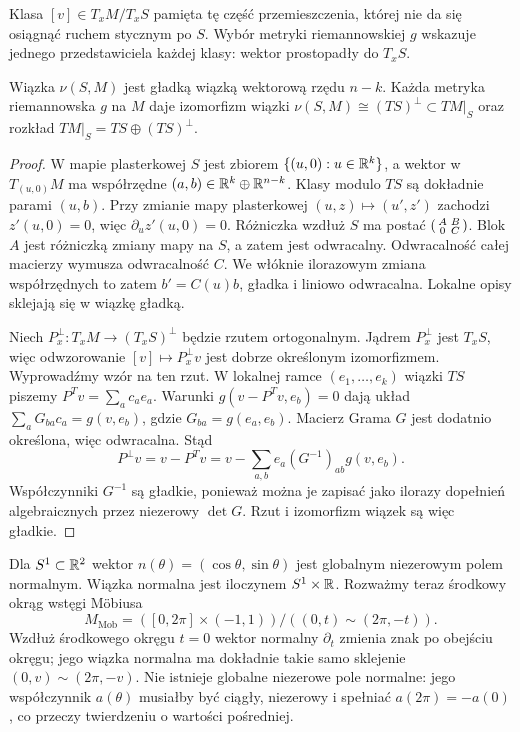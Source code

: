 Klasa $[v]\in T_xM/T_xS$ pamięta tę część
przemieszczenia, której nie da się osiągnąć
ruchem stycznym po $S$. Wybór metryki
riemannowskiej $g$ wskazuje jednego
przedstawiciela każdej klasy: wektor
prostopadły do $T_xS$.

\begin{stwierdzenie}
\label{prop:normalna-rozszczepienie}
Wiązka $\nu(S,M)$ jest gładką wiązką
wektorową rzędu $n-k$. Każda metryka
riemannowska $g$ na $M$ daje izomorfizm
wiązki $\nu(S,M)\cong(TS)^\perp\subset TM|_S$
oraz rozkład $TM|_S=TS\oplus(TS)^\perp$.
\end{stwierdzenie}
\begin{proof}
W mapie plasterkowej $S$ jest zbiorem
$\{(u,0):u\in\mathbb{R}^k\}$, a wektor w $T_{(u,0)}M$
ma współrzędne $(a,b)\in\mathbb{R}^k\oplus\mathbb{R}^{n-k}$.
Klasy modulo $TS$ są dokładnie parami $(u,b)$.
Przy zmianie mapy plasterkowej $(u,z)\mapsto(u',z')$
zachodzi $z'(u,0)=0$, więc $\partial_u z'(u,0)=0$.
Różniczka wzdłuż $S$ ma postać
$\begin{psmallmatrix}A&B\\0&C\end{psmallmatrix}$.
Blok $A$ jest różniczką zmiany mapy na $S$, a zatem jest
odwracalny. Odwracalność całej macierzy wymusza
odwracalność $C$.
We włóknie ilorazowym zmiana współrzędnych to zatem
$b'=C(u)b$, gładka i liniowo odwracalna.
Lokalne opisy sklejają się w wiązkę gładką.

Niech $P^\perp_x:T_xM\to(T_xS)^\perp$
będzie rzutem ortogonalnym.
Jądrem $P^\perp_x$ jest $T_xS$, więc
odwzorowanie $[v]\mapsto P^\perp_xv$ jest
dobrze określonym izomorfizmem.
Wyprowadźmy wzór na ten rzut.
W lokalnej ramce $(e_1,\ldots,e_k)$ wiązki $TS$ piszemy
$P^Tv=\sum_a c_ae_a$.
Warunki $g(v-P^Tv,e_b)=0$ dają układ
$\sum_aG_{ba}c_a=g(v,e_b)$, gdzie $G_{ba}=g(e_a,e_b)$.
Macierz Grama $G$ jest dodatnio określona, więc odwracalna.
Stąd
\[
 P^\perp v=v-P^Tv
 =v-\sum_{a,b}e_a(G^{-1})_{ab}g(v,e_b).
\]
Współczynniki $G^{-1}$ są gładkie, ponieważ można je
zapisać jako ilorazy dopełnień algebraicznych przez
niezerowy $\det G$. Rzut i izomorfizm wiązek są więc gładkie.
\end{proof}

\begin{przyklad}
\label{prz:normalna-mobius}
Dla $S^1\subset\mathbb{R}^2$ wektor
$n(\theta)=(\cos\theta,\sin\theta)$
jest globalnym niezerowym polem normalnym.
Wiązka normalna jest iloczynem
$S^1\times\mathbb{R}$.
Rozważmy teraz środkowy okrąg wstęgi
Möbiusa
\[
 M_{\mathrm{Mob}}
 =([0,2\pi]\times(-1,1))/
            ((0,t)\sim(2\pi,-t)).
\]
Wzdłuż środkowego okręgu $t=0$
wektor normalny $\partial_t$ zmienia
znak po obejściu okręgu; jego wiązka
normalna ma dokładnie takie samo
sklejenie $(0,v)\sim(2\pi,-v)$.
Nie istnieje globalne niezerowe
pole normalne: jego współczynnik
$a(\theta)$ musiałby być ciągły,
niezerowy i spełniać
$a(2\pi)=-a(0)$, co przeczy
twierdzeniu o wartości pośredniej.
\end{przyklad}

